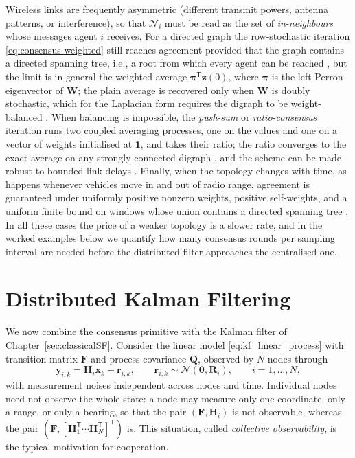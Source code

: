 Wireless links are frequently asymmetric (different transmit powers, antenna patterns, or interference), so that $\mathcal{N}_i$ must be read as the set of \emph{in-neighbours} whose messages agent $i$ receives. For a directed graph the row-stochastic iteration \eqref{eq:consensus-weighted} still reaches agreement provided that the graph contains a directed spanning tree, i.e., a root from which every agent can be reached \cite{ren2005_consensus}, but the limit is in general the weighted average $\boldsymbol{\pi}^{\mathsf T}\mathbf{z}(0)$, where $\boldsymbol{\pi}$ is the left Perron eigenvector of $\mathbf{W}$; the plain average is recovered only when $\mathbf{W}$ is doubly stochastic, which for the Laplacian form requires the digraph to be weight-balanced \cite{olfatisaber2007_consensus}. When balancing is impossible, the \emph{push-sum} or \emph{ratio-consensus} iteration runs two coupled averaging processes, one on the values and one on a vector of weights initialised at $\mathbf{1}$, and takes their ratio; the ratio converges to the exact average on any strongly connected digraph \cite{kempe2003_gossip}, and the scheme can be made robust to bounded link delays \cite{hadjicostis2014_delays}. Finally, when the topology changes with time, as happens whenever vehicles move in and out of radio range, agreement is guaranteed under uniformly positive nonzero weights, positive self-weights, and a uniform finite bound on windows whose union contains a directed spanning tree \cite{jadbabaie2003_coordination,ren2005_consensus}. In all these cases the price of a weaker topology is a slower rate, and in the worked examples below we quantify how many consensus rounds per sampling interval are needed before the distributed filter approaches the centralised one.

\section{Distributed Kalman Filtering}
\label{sec:mas-dkf}

We now combine the consensus primitive with the Kalman filter of Chapter~\ref{sec:classicalSF}. Consider the linear model \eqref{eq:kf_linear_process} with transition matrix $\mathbf{F}$ and process covariance $\mathbf{Q}$, observed by $N$ nodes through
\begin{equation}
\mathbf{y}_{i,k}=\mathbf{H}_i\mathbf{x}_k+\mathbf{r}_{i,k},\qquad \mathbf{r}_{i,k}\sim\mathcal{N}(\mathbf{0},\mathbf{R}_i),\qquad i=1,\dots,N,
\label{eq:dkf-local-measurement}
\end{equation}
with measurement noises independent across nodes and time. Individual nodes need not observe the whole state: a node may measure only one coordinate, only a range, or only a bearing, so that the pair $(\mathbf{F},\mathbf{H}_i)$ is not observable, whereas the pair $(\mathbf{F},[\mathbf{H}_1^{\mathsf T}\cdots\mathbf{H}_N^{\mathsf T}]^{\mathsf T})$ is. This situation, called \emph{collective observability}, is the typical motivation for cooperation.

